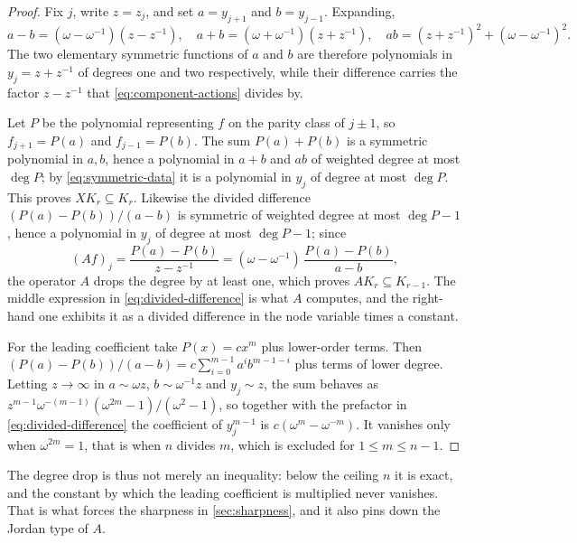 \documentclass[11pt,reqno]{amsart}
\theoremstyle{plain}
\theoremstyle{definition}
\theoremstyle{remark}
\numberwithin{equation}{section}
\begin{document}
\begin{proof}
Fix $j$, write $z=z_{j}$, and set $a=y_{j+1}$ and $b=y_{j-1}$. Expanding,
\begin{equation}
  a-b=(\omega-\omega^{-1})(z-z^{-1}),
  \quad
  a+b=(\omega+\omega^{-1})(z+z^{-1}),
  \quad
  ab=(z+z^{-1})^{2}+(\omega-\omega^{-1})^{2}.
  \label{eq:symmetric-data}
\end{equation}
The two elementary symmetric functions of $a$ and $b$ are therefore
polynomials in $y_{j}=z+z^{-1}$ of degrees one and two respectively, while
their difference carries the factor $z-z^{-1}$ that
\cref{eq:component-actions} divides by.

Let $P$ be the polynomial representing $f$ on the parity class of $j\pm1$, so
$f_{j+1}=P(a)$ and $f_{j-1}=P(b)$. The sum $P(a)+P(b)$ is a symmetric
polynomial in $a,b$, hence a polynomial in $a+b$ and $ab$ of weighted degree at
most $\deg P$; by \cref{eq:symmetric-data} it is a polynomial in $y_{j}$ of
degree at most $\deg P$. This proves $XK_{r}\subseteq K_{r}$. Likewise the
divided difference $(P(a)-P(b))/(a-b)$ is symmetric of weighted degree at most
$\deg P-1$, hence a polynomial in $y_{j}$ of degree at most $\deg P-1$; since
\begin{equation}
  (Af)_{j}=\frac{P(a)-P(b)}{z-z^{-1}}
  =(\omega-\omega^{-1})\,\frac{P(a)-P(b)}{a-b},
  \label{eq:divided-difference}
\end{equation}
the operator $A$ drops the degree by at least one, which proves
$AK_{r}\subseteq K_{r-1}$. The middle expression in
\cref{eq:divided-difference} is what $A$ computes, and the right-hand one
exhibits it as a divided difference in the node variable times a constant.

For the leading coefficient take $P(x)=cx^{m}$ plus lower-order terms. Then
$(P(a)-P(b))/(a-b)=c\sum_{i=0}^{m-1}a^{i}b^{m-1-i}$ plus terms of lower degree.
Letting $z\to\infty$ in $a\sim\omega z$, $b\sim\omega^{-1}z$ and $y_{j}\sim z$,
the sum behaves as
$z^{m-1}\omega^{-(m-1)}(\omega^{2m}-1)/(\omega^{2}-1)$, so together with the
prefactor in \cref{eq:divided-difference} the coefficient of $y_{j}^{m-1}$ is
$c(\omega^{m}-\omega^{-m})$. It vanishes only when $\omega^{2m}=1$, that is
when $n$ divides $m$, which is excluded for $1\le m\le n-1$.
\end{proof}

The degree drop is thus not merely an inequality: below the ceiling $n$ it is
exact, and the constant by which the leading coefficient is multiplied never
vanishes. That is what forces the sharpness in \cref{sec:sharpness}, and it
also pins down the Jordan type of $A$.
\end{document}
